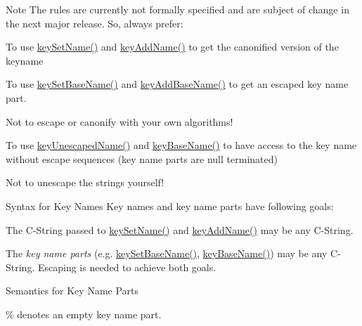 \begin{DoxyNote}{Note}
The rules are currently not formally specified and are subject of change in the next major release. So, always prefer\-:
\begin{DoxyItemize}
\item To use \hyperlink{group__keyname_ga7699091610e7f3f43d2949514a4b35d9}{key\-Set\-Name()} and \hyperlink{group__keyname_gaa70593a2c772c4b7bc33423b9b10a270}{key\-Add\-Name()} to get the canonified version of the keyname
\item To use \hyperlink{group__keyname_ga6e804bd453f98c28b0ff51430d1df407}{key\-Set\-Base\-Name()} and \hyperlink{group__keyname_gaa942091fc4bd5c2699e49ddc50829524}{key\-Add\-Base\-Name()} to get an escaped key name part.
\item Not to escape or canonify with your own algorithms!
\item To use \hyperlink{group__api_ga6fe6af4c27b35d911a533f4ae4d698bb}{key\-Unescaped\-Name()} and \hyperlink{group__keyname_gaaff35e7ca8af5560c47e662ceb9465f5}{key\-Base\-Name()} to have access to the key name without escape sequences (key name parts are null terminated)
\item Not to unescape the strings yourself!
\end{DoxyItemize}
\end{DoxyNote}
\begin{DoxyParagraph}{Syntax for Key Names}
Key names and key name parts have following goals\-:
\begin{DoxyItemize}
\item The C-\/\-String passed to \hyperlink{group__keyname_ga7699091610e7f3f43d2949514a4b35d9}{key\-Set\-Name()} and \hyperlink{group__keyname_gaa70593a2c772c4b7bc33423b9b10a270}{key\-Add\-Name()} may be any C-\/\-String.
\item The {\itshape key name parts} (e.\-g. \hyperlink{group__keyname_ga6e804bd453f98c28b0ff51430d1df407}{key\-Set\-Base\-Name()}, \hyperlink{group__keyname_gaaff35e7ca8af5560c47e662ceb9465f5}{key\-Base\-Name()}) may be any C-\/\-String. Escaping is needed to achieve both goals.
\end{DoxyItemize}
\end{DoxyParagraph}
\begin{DoxyParagraph}{Semantics for Key Name Parts}

\begin{DoxyItemize}
\item \% denotes an empty key name part.
\end{DoxyItemize}
\end{DoxyParagraph}
